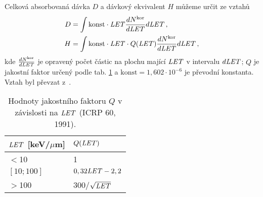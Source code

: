 Celková absorbovaná dávka $D$ a dávkový ekvivalent $H$ můžeme určit ze vztahů 
\begin{align}
  D&=\int\text{konst}\cdot\mathit{LET}\frac{dN^{\text{kor}}}{d\mathit{LET}}d\mathit{LET}\,,\label{eq:Davka}\\
  H&=\int\text{konst}\cdot\mathit{LET}\cdot Q(\mathit{LET})\frac{dN^{\text{kor}}}{d\mathit{LET}}d\mathit{LET}\,,\label{eq:EkvDavka}
\end{align}
kde $\frac{dN^{\text{kor}}}{d\mathit{LET}}$ je opravený počet částic na plochu mající $\mathit{LET}$ v intervalu $d\mathit{LET}$; $Q$ je jakostní faktor určený podle tab. \ref{tab:detektory_Q} a $\text{konst}=1,602\cdot 10^{-6}$ je převodní konstanta. Vztah byl převzat z~\cite{thesisKPBrabcova}.

\begin{table}[H]
  \centering
  \caption{Hodnoty jakostního faktoru $Q$ v závislosti na $\mathit{LET}$ (ICRP 60, 1991).}
  \label{tab:detektory_Q}
  \begin{tabular}{ll}
	\toprule
	$\mathit{LET}$ [keV/$\mu$m]&$Q(\mathit{LET})$ \\
	\midrule
$<$10&1\\
$[10;100]$&$0,32\mathit{LET}-2,2$\\
$>$100&300/$\sqrt{\mathit{LET}}$\\
	\bottomrule
  \end{tabular}
\end{table}







